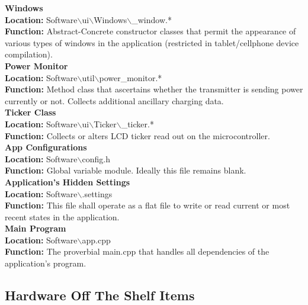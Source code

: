 \documentclass[12pt]{article}
\newcommand{\cross}[1][1pt]{\ooalign{ 	%
  \rule[1ex]{1ex}{#1}\cr%
  \hss\rule{#1}{.7em}\hss\cr}}%
\begin{document}
 \noindent
\textbf{
Windows\\
Location: }
Software$\backslash$ui$\backslash$Windows$\backslash$\cross[0.4pt]\cross[0.4pt]\cross[0.4pt]\_window.*\\
\textbf{
Function: }
Abstract-Concrete constructor classes that permit the appearance of various types of windows in the application (restricted in tablet/cellphone device compilation).\\
 
 \noindent
\textbf{
Power Monitor\\
Location: }
Software$\backslash$util$\backslash$power\_monitor.*\\
\textbf{
Function: }
Method class that ascertains whether the transmitter is sending power currently or not. Collects additional ancillary charging data.\\
 
 \noindent
\textbf{
Ticker Class\\
Location: }
Software$\backslash$ui$\backslash$Ticker$\backslash$\cross[0.4pt]\cross[0.4pt]\cross[0.4pt]\_ticker.*\\
\textbf{
Function: }
Collects or alters LCD ticker read out on the microcontroller.\\
 
 \noindent
\textbf{
App Configurations\\
Location: }
Software$\backslash$config.h\\
\textbf{
Function: }
Global variable module.  Ideally this file remains blank.\\
 
 \noindent
\textbf{
Application’s Hidden Settings\\
Location: }
Software$\backslash$.settings\\
\textbf{
Function: }
This file shall operate as a flat file to write or read current or most recent states in the application.\\
 
 \noindent
\textbf{
Main Program\\
Location: }
Software$\backslash$app.cpp\\
\textbf{
Function: }
The proverbial main.cpp that handles all dependencies of the application’s program.

\pagebreak

\subsection{Hardware Off The Shelf Items}
\end{document}
